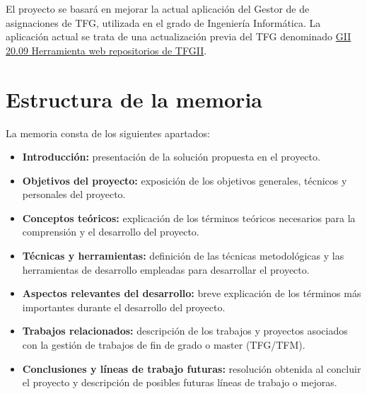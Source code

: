 
El proyecto se basará en mejorar la actual aplicación del Gestor de de asignaciones de TFG, utilizada en el grado de Ingeniería Informática. La aplicación actual se trata de una actualización previa del TFG denominado \href{https://github.com/dbo1001/Gestor-TFG-2021}{GII 20.09 Herramienta web
repositorios de TFGII}. 



\section{Estructura de la memoria}
La memoria consta de los siguientes apartados:

\begin{itemize}
	\item \textbf{Introducción:} presentación de la solución propuesta en el proyecto. 
	\item \textbf{Objetivos del proyecto:}  exposición de los  objetivos generales, técnicos y personales del proyecto.
	\item \textbf{Conceptos teóricos:} explicación de los términos teóricos necesarios para la comprensión y el desarrollo del proyecto.
	\item \textbf{Técnicas y herramientas:} definición de las técnicas metodológicas y las herramientas de desarrollo empleadas para desarrollar el proyecto.
	\item \textbf{Aspectos relevantes del desarrollo:} breve explicación de los términos más importantes durante el desarrollo del proyecto.
	\item \textbf{Trabajos relacionados:} descripción de los trabajos y proyectos asociados con la gestión de trabajos de fin de grado o master (TFG/TFM).
	\item \textbf{Conclusiones y líneas de trabajo futuras:} resolución obtenida al concluir el proyecto y descripción de posibles futuras líneas de trabajo o mejoras.
\end{itemize}